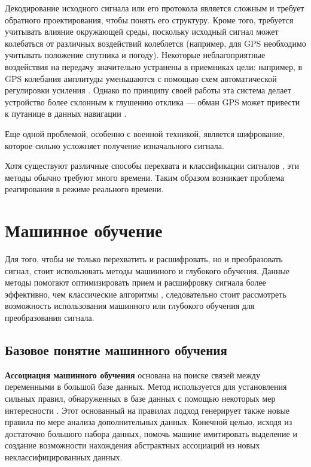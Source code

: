 Декодирование исходного сигнала или его протокола является сложным и требует обратного проектирования, чтобы понять его структуру. Кроме того, требуется учитывать влияние окружающей среды, поскольку исходный сигнал может колебаться от различных воздействий колеблется (например, для GPS необходимо учитывать положение спутника и погоду). Некоторые неблагоприятные воздействия на передачу значительно устранены в приемниках цели: например, в GPS колебания амплитуды уменьшаются с помощью схем автоматической регулировки усиления \cite{autogaincontrol}. Однако по принципу своей работы эта система делает устройство более склонным к глушению отклика --- обман GPS может привести к путанице в данных навигации \cite{gpsspoofing}.

Еще одной проблемой, особенно с военной техникой, является шифрование, которое сильно усложняет получение изначального сигнала.

Хотя существуют различные способы перехвата и классификации сигналов \cite{analisanddecod}, эти методы обычно требуют много времени. Таким образом возникает проблема реагирования в режиме реального времени.

\section{Машинное обучение}

Для того, чтобы не только перехватить и расшифровать, но и преобразовать сигнал, стоит использовать методы машинного и глубокого обучения. Данные методы помогают оптимизировать прием и расшифровку сигнала более эффективно, чем классические алгоритмы \cite{deeplearnofdm}, следовательно стоит рассмотреть возможность использования машинного или глубокого обучения для преобразования сигнала.

\subsection{Базовое понятие машинного обучения}

\textbf{Ассоциация машинного обучения} основана на поиске связей между переменными в большой базе данных. Метод используется для установления сильных правил, обнаруженных в базе данных с помощью некоторых мер интересности \cite{introdmachlearn}. Этот основанный на правилах подход генерирует также новые правила по мере анализа дополнительных данных. Конечной целью, исходя из достаточно большого набора данных, помочь машине имитировать выделение и создание возможности нахождения абстрактных ассоциаций из новых неклассифицированных данных.

